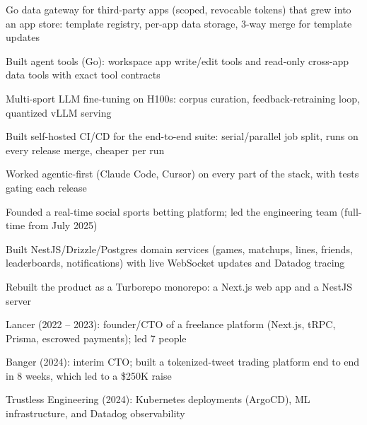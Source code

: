 \documentclass[print]{jack-resume}
\begin{document}
\begin{tightemize}
    \item Go data gateway for third-party apps (scoped, revocable tokens) that grew into an app store: template registry, per-app data storage, 3-way merge for template updates
    \item Built agent tools (Go): workspace app write/edit tools and read-only cross-app data tools with exact tool contracts
    \item Multi-sport LLM fine-tuning on H100s: corpus curation, feedback-retraining loop, quantized vLLM serving
    \item Built self-hosted CI/CD for the end-to-end suite: serial/parallel job split, runs on every release merge, cheaper per run
    \item Worked agentic-first (Claude Code, Cursor) on every part of the stack, with tests gating each release
\end{tightemize}
\sectionsep

\begin{tightemize}
    \item Founded a real-time social sports betting platform; led the engineering team (full-time from July 2025)
    \item Built NestJS/Drizzle/Postgres domain services (games, matchups, lines, friends, leaderboards, notifications) with live WebSocket updates and Datadog tracing
    \item Rebuilt the product as a Turborepo monorepo: a Next.js web app and a NestJS server
\end{tightemize}
\sectionsep

\begin{tightemize}
    \item Lancer (2022 -- 2023): founder/CTO of a freelance platform (Next.js, tRPC, Prisma, escrowed payments); led 7 people
    \item Banger (2024): interim CTO; built a tokenized-tweet trading platform end to end in 8 weeks, which led to a \$250K raise
    \item Trustless Engineering (2024): Kubernetes deployments (ArgoCD), ML infrastructure, and Datadog observability
\end{tightemize}
\sectionsep
\end{document}
